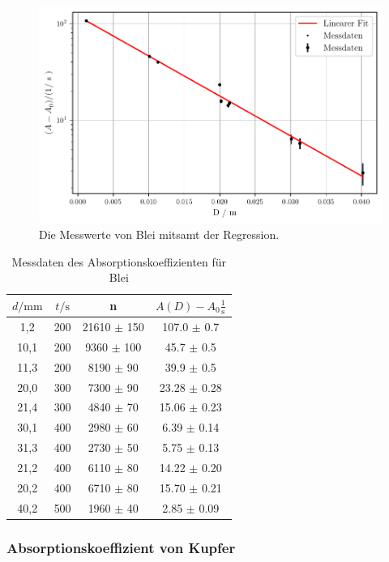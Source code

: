 \begin{figure}
    \centering
    \includegraphics[width=0.7 \linewidth]{build/plot1.pdf}
    \caption{Die Messwerte von Blei mitsamt der Regression.}
    \label{fig:plot1}
\end{figure}


\begin{table}
    \center
    \begin{tabular}{c c c c}
        \toprule
        $d / \unit{\milli\meter}$ &  $t / \unit\second$ &     n & $A(D) - A_0 \frac{1}{\unit\second}$\\ 
        \midrule
            1,2 &  200 & 21610 $\pm$ 150 &  107.0 $\pm$ 0.7 \\
           10,1 &  200 &  9360 $\pm$ 100 &   45.7 $\pm$ 0.5 \\
           11,3 &  200 &  8190 $\pm$ 90  &   39.9 $\pm$ 0.5 \\
           20,0 &  300 &  7300 $\pm$ 90  & 23.28  $\pm$ 0.28 \\
           21,4 &  300 &  4840 $\pm$ 70  & 15.06  $\pm$ 0.23 \\
           30,1 &  400 &  2980 $\pm$ 60  &  6.39  $\pm$ 0.14 \\
           31,3 &  400 &  2730 $\pm$ 50  &  5.75  $\pm$ 0.13 \\
           21,2 &  400 &  6110 $\pm$ 80  & 14.22  $\pm$ 0.20 \\
           20,2 &  400 &  6710 $\pm$ 80  & 15.70  $\pm$ 0.21 \\
           40,2 &  500 &  1960 $\pm$ 40  &  2.85  $\pm$ 0.09 \\
        \bottomrule
    \end{tabular}
    \caption{Messdaten des Absorptionskoeffizienten für Blei}
    \label{tab:md1blei}
\end{table}

\subsubsection*{Absorptionskoeffizient von Kupfer}

